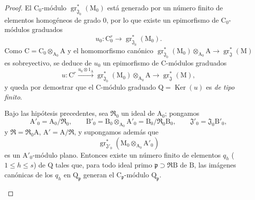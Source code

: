 \begin{proof}
El $\mathrm{C}_0$-módulo $\operatorname{gr}^*_{\mathfrak{J}_0}(\mathrm{M}_0)$ está generado por un número finito de elementos homogéneos de grado $0$, por lo que existe un epimorfismo de $\mathrm{C}_0$-módulos graduados
\[
  u_0:\mathrm{C}_0^r\longrightarrow\operatorname{gr}^*_{\mathfrak{J}_0}(\mathrm{M}_0).
\]
Como $\mathrm{C}=\mathrm{C}_0\otimes_{\mathrm{A}_0}\mathrm{A}$ y el homomorfismo canónico $\operatorname{gr}^*_{\mathfrak{J}_0}(\mathrm{M}_0)\otimes_{\mathrm{A}_0}\mathrm{A}\to\operatorname{gr}^*_\mathfrak{J}(\mathrm{M})$ es sobreyectivo, se deduce de $u_0$ un epimorfismo de $\mathrm{C}$-módulos graduados
\[
  u:\mathrm{C}^r\xrightarrow{u_0\otimes 1_{\mathrm{A}}}\operatorname{gr}^*_{\mathfrak{J}_0}(\mathrm{M}_0)\otimes_{\mathrm{A}_0}\mathrm{A}\longrightarrow\operatorname{gr}^*_\mathfrak{J}(\mathrm{M}),
\]
y queda por demostrar que el $\mathrm{C}$-módulo graduado
$\mathrm{Q}=\operatorname{Ker}(u)$ es \emph{de tipo finito}.
\\[0.4\baselineskip]
\begin{lemma}[11.2.9.6]
\label{IV.11.2.9.6}
Bajo las hipótesis precedentes, sea $\mathfrak{R}_0$ un ideal de $\mathrm{A}_0$; pongamos
\[
  \mathrm{A}'_0=\mathrm{A}_0/\mathfrak{R}_0,\qquad
  \mathrm{B}'_0=\mathrm{B}_0\otimes_{\mathrm{A}_0}\mathrm{A}'_0
  =\mathrm{B}_0/\mathfrak{R}_0\mathrm{B}_0,\qquad
  \mathfrak{J}'_0=\mathfrak{J}_0\mathrm{B}'_0,
\]
y $\mathfrak{R}=\mathfrak{R}_0\mathrm{A}$, $\mathrm{A}'=\mathrm{A}/\mathfrak{R}$, y supongamos además que
\[
  \operatorname{gr}^*_{\mathfrak{J}'_0}
  (\mathrm{M}_0\otimes_{\mathrm{A}_0}\mathrm{A}'_0)
\]
es un $\mathrm{A}'_0$-módulo plano. Entonces existe un número finito de elementos $q_h$ ($1\leqslant h\leqslant s$) de $\mathrm{Q}$ tales que, para todo ideal primo $\mathfrak{p}\supset\mathfrak{R}\mathrm{B}$ de $\mathrm{B}$, las imágenes canónicas de los $q_h$ en $\mathrm{Q}_\mathfrak{p}$ generan el $\mathrm{C}_\mathfrak{p}$-módulo $\mathrm{Q}_\mathfrak{p}$.
\end{lemma}


\end{proof}
